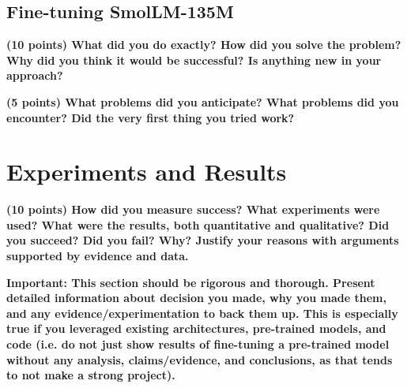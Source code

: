 \documentclass[10pt,twocolumn,letterpaper]{article}
\begin{document}
\subsection{Fine-tuning SmolLM-135M}



\textbf{(10 points) What did you do exactly? How did you solve the problem? Why did you think it would be successful? Is anything new in your approach? }

\textbf{(5 points) What problems did you anticipate? What problems did you encounter? Did the very first thing you tried work? }



\section{Experiments and Results}







\textbf{(10 points) How did you measure success? What experiments were used? What were the results, both quantitative and qualitative? Did you succeed? Did you fail? Why? Justify your reasons with arguments supported by evidence and data.}

\textbf{Important: This section should be rigorous and thorough. Present detailed information about decision you made, why you made them, and any evidence/experimentation to back them up. This is especially true if you leveraged existing architectures, pre-trained models, and code (i.e. do not just show results of fine-tuning a pre-trained model without any analysis, claims/evidence, and conclusions, as that tends to not make a strong project). }
\end{document}
